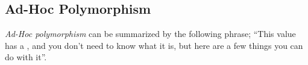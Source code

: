 \subsection{Ad-Hoc Polymorphism}\label{subsec:Ad_Hoc_Polymorphism}
\begin{definition}\label{def:Ad_Hoc_Polymorphism}
  \emph{Ad-Hoc polymorphism} can be summarized by the following phrase; ``This value has a , and you don't need to know what it is, but here are a few things you can do with it''.
\end{definition}

\begin{definition}[Typeclass]
  
\end{definition}

